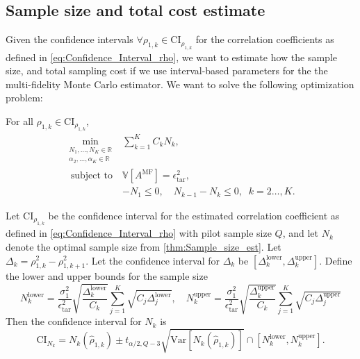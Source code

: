 

%
\subsection{Sample size and total cost estimate}
Given the confidence intervals $\forall \rho_{1,k} \in \text{CI}_{\rho_{1,k}}$ for the correlation coefficients as defined in \eqref{eq:Confidence_Interval_rho}, we want to estimate how the sample size, and total sampling cost if we use interval-based parameters for the the multi-fidelity Monte Carlo estimator. We want to solve the following optimization problem: 

For all $\rho_{1,k} \in \text{CI}_{\rho_{1,k}}$, 
%
\begin{equation}\label{eq:Optimization_pb_Confidence_Interval}
    \begin{array}{ll}
    \min \limits_{\begin{array}{c}\scriptstyle N_1,\ldots, N_K\in \mathbb{R} \\[-4pt]
\scriptstyle \alpha_2,\ldots,\alpha_K\in \mathbb{R}
\end{array}} &\displaystyle\sum\limits_{k=1}^K C_kN_k,\\
       \;\,\text{subject to} &\mathbb{V}\left[A^{\text{MF}}\right]= \epsilon_{\text{tar}}^2, \\[2pt]
       &\displaystyle -N_1\le 0,\quad \displaystyle N_{k-1}-N_k\le 0, \;\; k=2\ldots,K.
    \end{array}
\end{equation}
%

%
\begin{theorem}
\label{thm:Sample_size_est_conf_interval} 
Let $\text{CI}_{\rho_{1,k}}$ be the confidence interval for the estimated correlation coefficient as defined in \eqref{eq:Confidence_Interval_rho} with pilot sample size $Q$, and let $N_k$ denote the optimal sample size from \eqref{thm:Sample_size_est}. Let
$\Delta_k = \rho_{1,k}^2 - \rho_{1,k+1}^2.$ Let the confidence interval for $\Delta_k$ be $\left[\Delta_k^{\text{lower}},\Delta_k^{\text{upper}}\right]$. Define the lower and upper bounds for the sample size
%
\begin{equation}\label{eq:upper_lower_N_k}
    N_k^{\text{lower}} = \frac{\sigma_1^2}{\epsilon_{\text{tar}}^2}\sqrt{\frac{\Delta_k^{\text{lower}}}{C_k}}\sum_{j=1}^K\sqrt{C_j\Delta_j^{\text{lower}}},\quad N_k^{\text{upper}} = \frac{\sigma_1^2}{\epsilon_{\text{tar}}^2}\sqrt{\frac{\Delta_k^{\text{upper}}}{C_k}}\sum_{j=1}^K\sqrt{C_j\Delta_j^{\text{upper}}}
\end{equation}
%
Then the confidence interval for $N_k$ is
%
\[
\text{CI}_{N_k} = N_k\left(\widehat\rho_{1,k}\right)\pm t_{\alpha/2,Q-3}\sqrt{\text{Var}\left[N_k\left(\widehat\rho_{1,k}\right)\right]}\cap \left[N_k^{\text{lower}}, N_k^{\text{upper}}\right].
\]
%
\end{theorem}



